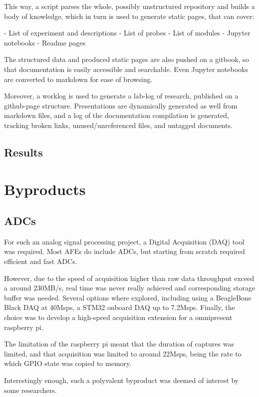 \documentclass[conference]{IEEEtran}
\begin{document}
This way, a script parses the whole, possibly unstructured repository and builds a body of knowledge, which in turn is used to generate static pages, that can cover:

- List of experiment and descriptions
- List of probes
- List of modules
- Jupyter notebooks
- Readme pages

The structured data and produced static pages are also pushed on a gitbook, so that documentation is easily accessible and searchable. Even Jupyter notebooks are converted to markdown for ease of browsing.

Moreover, a worklog is used to generate a lab-log of research, published on a github-page structure. Presentations are dynamically generated as well from markdown files, and a log of the documentation compilation is generated, tracking broken links, unused/unreferenced files, and untagged documents.



\subsection{Results}
 
 
 
\section{Byproducts}

\subsection{ADCs}

For such an analog signal processing project, a Digital Acquisition (DAQ) tool was required. Most AFEs do include ADCs, but starting from scratch required efficient and fast ADCs. 

However, due to the speed of acquisition higher than raw data throughput exceed a around 230MB/s, real time was never really achieved and corresponding storage buffer was needed. Several options where explored, including using a BeagleBone Black DAQ at 40Msps, a STM32 onboard DAQ up to 7.2Msps. Finally, the choice was to develop a high-speed acquisition extension for a omnipresent raspberry pi.

The limitation of the raspberry pi meant that the duration of captures was limited, and that acquisition was limited to around 22Msps, being the rate to which GPIO state was copied to memory. 

Interestingly enough, such a polyvalent byproduct was deemed of interest by some researchers.
\end{document}
